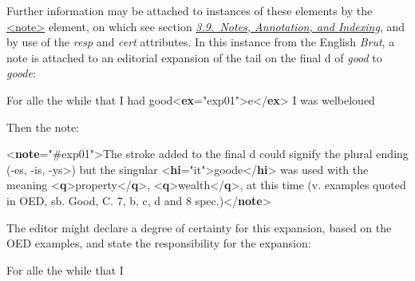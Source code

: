 Further information may be attached to instances of these elements by the \hyperref[TEI.note]{<note>} element, on which see section \textit{\hyperref[CONO]{3.9.\ Notes, Annotation, and Indexing}}, and by use of the {\itshape resp} and {\itshape cert} attributes. In this instance from the English \textit{Brut}, a note is attached to an editorial expansion of the tail on the final d of \textit{good} to \textit{goode}: \par\bgroup{}\exampleFont \begin{shaded}\noindent\mbox{}For alle the while\mbox{}\newline 
 that I had good{<\textbf{ex}\hspace*{1em}{xml:id}="{exp01}">}e{</\textbf{ex}>} I was welbeloued\end{shaded}\egroup\par \noindent   Then the note: \par\bgroup{}\exampleFont \begin{shaded}\noindent\mbox{}{<\textbf{note}\hspace*{1em}{target}="{\#exp01}">}The stroke added to\mbox{}\newline 
 the final d could signify the plural ending (-es, -is, -ys>) but the\mbox{}\newline 
 singular {<\textbf{hi}\hspace*{1em}{rend}="{it}">}goode{</\textbf{hi}>} was used with the meaning {<\textbf{q}>}property{</\textbf{q}>},\mbox{}\newline 
{<\textbf{q}>}wealth{</\textbf{q}>}, at this time (v. examples quoted in OED, sb. Good, C. 7, b,\mbox{}\newline 
 c, d and 8 spec.){</\textbf{note}>}\end{shaded}\egroup\par \noindent  The editor might declare a degree of certainty for this expansion, based on the OED examples, and state the responsibility for the expansion: \par\bgroup{}\exampleFont \begin{shaded}\noindent\mbox{}For alle the while that I\mbox{}\newline 

\end{shaded}
